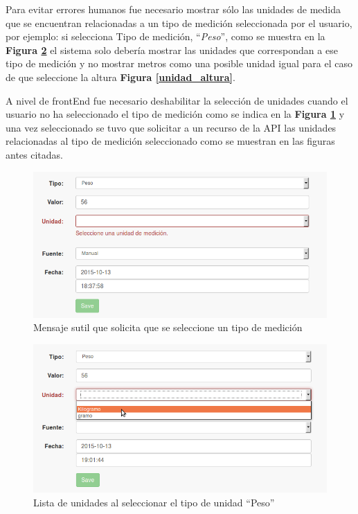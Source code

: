 \documentclass[a4paper,12pt]{article}
\begin{document}
Para evitar errores humanos fue necesario mostrar sólo las unidades de medida que se encuentran relacionadas a un tipo de medición seleccionada por el usuario, por ejemplo: si selecciona Tipo de medición, ``\textit{Peso}'', como se muestra en la \textbf{Figura \ref{unidad_peso}} el sistema solo debería mostrar las unidades que correspondan a ese tipo de medición y no mostrar metros como una posible unidad igual para el caso de que seleccione la altura  \textbf{Figura \ref{unidad_altura}}.

A nivel de frontEnd fue necesario deshabilitar  la selección de unidades cuando el usuario no ha seleccionado el tipo de medición como se indica en la \textbf{Figura \ref{msj_seleccione_tipo}} y una vez seleccionado se tuvo que solicitar a un recurso de la API las unidades relacionadas al tipo de medición seleccionado como se muestran en las figuras antes citadas.

 
 \begin{figure}[h!]
  \centering
  \includegraphics[width=.8\textwidth]{img/3-selecciona_tipo}
  \caption{Mensaje sutil que solicita que se seleccione un tipo de medición }
  \label{msj_seleccione_tipo}
\end{figure}

\begin{figure}[h!]
  \centering
  \includegraphics[width=.8\textwidth]{img/3-unidad_peso}
  \caption{Lista de unidades al seleccionar el tipo de unidad ``Peso''}
  \label{unidad_peso}
\end{figure}
\end{document}
